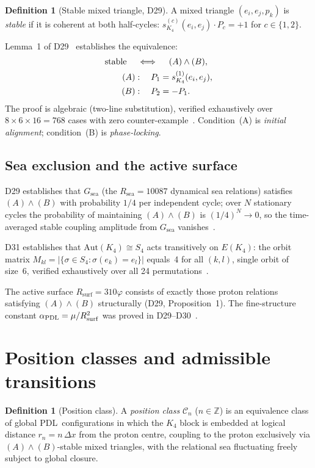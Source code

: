 \documentclass[11pt,a4paper]{article}
\theoremstyle{definition}
\newtheorem{definition}[theorem]{Definition}
\newcommand{\PDL}{\textnormal{PDL}}
\newcommand{\Rsurf}{R_{\mathrm{surf}}}
\newcommand{\Rsea}{R_{\mathrm{sea}}}
\newcommand{\vp}{\varphi}
\newcommand{\aPDL}{\alpha_{\PDL}}
\newcommand{\Gsea}{G_{\mathrm{sea}}}
\begin{document}
\begin{definition}[Stable mixed triangle, D29]
A mixed triangle $(e_i,e_j,p_k)$ is \emph{stable} if it is coherent at both half-cycles: $s_{K_4}^{(c)}(e_i,e_j)\cdot P_c = +1$ for $c\in\{1,2\}$.
\end{definition}

Lemma~1 of D29~\cite{PDL_D29_2026} establishes the equivalence:
\begin{align}
\text{stable}\quad &\iff\quad (A)\wedge(B), \notag \\
(A) &:\quad P_1 = s_{K_4}^{(1)}(e_i,e_j), \label{eq:A} \\
(B) &:\quad P_2 = -P_1. \label{eq:B}
\end{align}
The proof is algebraic (two-line substitution), verified exhaustively over $8\times 6\times 16 = 768$ cases with zero counter-example~\cite{PDL_D29_2026}. Condition~(A) is \emph{initial alignment}; condition~(B) is \emph{phase-locking}.

\subsection{Sea exclusion and the active surface}

D29 establishes that $\Gsea$ (the $\Rsea = 10087$ dynamical sea relations) satisfies $(A)\wedge(B)$ with probability $1/4$ per independent cycle; over $N$ stationary cycles the probability of maintaining $(A)\wedge(B)$ is $(1/4)^N\to 0$, so the time-averaged stable coupling amplitude from $\Gsea$ vanishes~\cite{PDL_D29_2026}.

D31 establishes that $\mathrm{Aut}(K_4)\cong S_4$ acts transitively on $E(K_4)$: the orbit matrix $M_{kl} = |\{\sigma\in S_4 : \sigma(e_k) = e_l\}|$ equals~4 for all $(k,l)$, single orbit of size~6, verified exhaustively over all 24 permutations~\cite{PDL_D31_2026}.

The active surface $\Rsurf = 310\vp$ consists of exactly those proton relations satisfying $(A)\wedge(B)$ structurally (D29, Proposition~1). The fine-structure constant $\aPDL = \mu/\Rsurf^2$ was proved in D29--D30~\cite{PDL_D29_2026,PDL_D30_2026}.

\section{Position classes and admissible transitions}
\label{sec:classes}

\begin{definition}[Position class]
\label{def:class}
A \emph{position class} $\mathcal{C}_n$ ($n\in\mathbb{Z}$) is an equivalence class of global \PDL\ configurations in which the $K_4$ block is embedded at logical distance $r_n = n\,\Delta x$ from the proton centre, coupling to the proton exclusively via $(A)\wedge(B)$-stable mixed triangles, with the relational sea fluctuating freely subject to global closure.
\end{definition}
\end{document}
